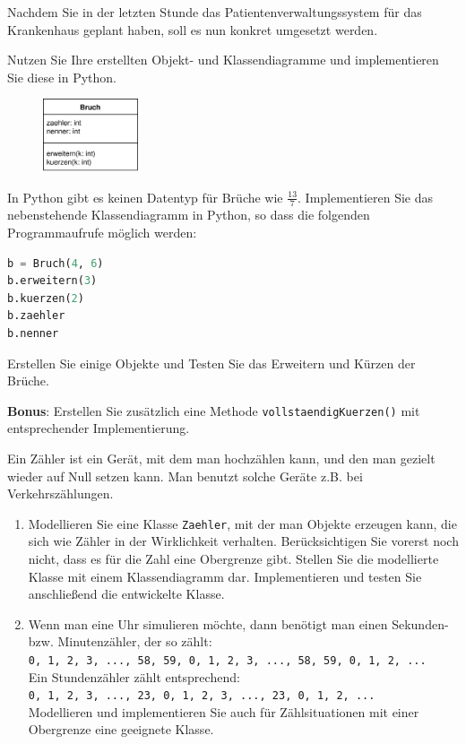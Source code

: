 \documentclass[11pt, a4paper, oneside]{article}
\begin{document}
	\pagebreak
	
	
	Nachdem Sie in der letzten Stunde das Patientenverwaltungssystem für das Krankenhaus geplant haben, soll es nun konkret umgesetzt werden.
	
	Nutzen Sie Ihre erstellten Objekt- und Klassendiagramme und implementieren Sie diese in Python.
	
	
	\begin{figure}
		\includegraphics[width=0.25\textwidth]{Bruch.png}
	\end{figure}

	In Python gibt es keinen Datentyp für Brüche wie $\frac{13}{7}$.
	Implementieren Sie das nebenstehende Klassendiagramm in Python, so dass die folgenden Programmaufrufe möglich werden:
	
	\begin{lstlisting}[language=python, numbers=none]
b = Bruch(4, 6)
b.erweitern(3)
b.kuerzen(2)
b.zaehler
b.nenner
	\end{lstlisting}
	
	Erstellen Sie einige Objekte und Testen Sie das Erweitern und Kürzen der Brüche.
	
	\textbf{Bonus}: Erstellen Sie zusätzlich eine Methode \texttt{vollstaendigKuerzen()} mit entsprechender Implementierung.
	
	
	Ein Zähler ist ein Gerät, mit dem man hochzählen kann, und den man gezielt wieder auf Null setzen kann.
	Man benutzt solche Geräte z.B. bei Verkehrszählungen.
	
	\begin{enumerate}[label=\alph*)]
		\item Modellieren Sie eine Klasse \texttt{Zaehler}, mit der man Objekte erzeugen kann, die sich wie Zähler in der Wirklichkeit verhalten.
		Berücksichtigen Sie vorerst noch nicht, dass es für die Zahl eine Obergrenze gibt.
		Stellen Sie die modellierte Klasse mit einem Klassendiagramm dar.
		Implementieren und testen Sie anschließend die entwickelte Klasse.
		\item Wenn man eine Uhr simulieren möchte, dann benötigt man einen Sekunden- bzw. Minutenzähler, der so zählt:\\
		\texttt{0, 1, 2, 3, ..., 58, 59, 0, 1, 2, 3, ..., 58, 59, 0, 1, 2, ...}\\
		Ein Stundenzähler zählt entsprechend:\\
		\texttt{0, 1, 2, 3, ..., 23, 0, 1, 2, 3, ..., 23, 0, 1, 2, ...}\\
		Modellieren und implementieren Sie auch für Zählsituationen mit einer Obergrenze eine geeignete Klasse.
	\end{enumerate}
	
\end{document}
